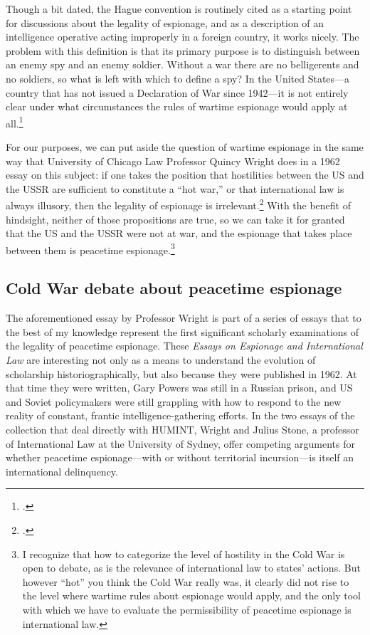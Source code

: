 \documentclass{memoir}
\begin{document}
\begin{refsegment}
Though a bit dated, the Hague convention is routinely cited as a starting point for discussions about the legality of espionage, and as a description of an intelligence operative acting improperly in a foreign country, it works nicely. The problem with this definition is that its primary purpose is to distinguish between an enemy spy and an enemy soldier. Without a war there are no belligerents and no soldiers, so what is left with which to define a spy? In the United States---a country that has not issued a Declaration of War since 1942---it is not entirely clear under what circumstances the rules of wartime espionage would apply at all.\footcite{ncc_staff_when_2018}


For our purposes, we can put aside the question of wartime espionage in the same way that University of Chicago Law Professor Quincy Wright does in a 1962 essay on this subject: if one takes the position that hostilities between the US and the USSR are sufficient to constitute a ``hot war,'' or that international law is always illusory, then the legality of espionage is irrelevant.\footcite[p.~8]{wright_espionage_1962} With the benefit of hindsight, neither of those propositions are true, so we can take it for granted that the US and the USSR were not at war, and the espionage that takes place between them is peacetime espionage.\footnote{I recognize that how to categorize the level of hostility in the Cold War is open to debate, as is the relevance of international law to states' actions. But however ``hot'' you think the Cold War really was, it clearly did not rise to the level where wartime rules about espionage would apply, and the only tool with which we have to evaluate the permissibility of peacetime espionage is international law.}

\subsection{Cold War debate about peacetime espionage}
The aforementioned essay by Professor Wright is part of a series of essays that to the best of my knowledge represent the first significant scholarly examinations of the legality of peacetime espionage. These \emph{Essays on Espionage and International Law} are interesting not only as a means to understand the evolution of scholarship historiographically, but also because they were published in 1962. At that time they were written, Gary Powers was still in a Russian prison, and US and Soviet policymakers were still grappling with how to respond to the new reality of constant, frantic intelligence-gathering efforts. In the two essays of the collection that deal directly with HUMINT, Wright and Julius Stone, a professor of International Law at the University of Sydney, offer competing arguments for whether peacetime espionage---with or without territorial incursion---is itself an international delinquency.


\end{refsegment}
\end{document}
